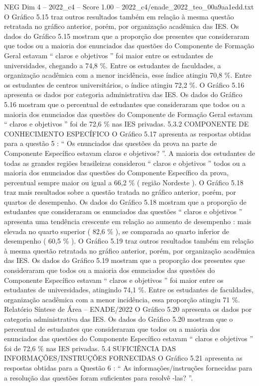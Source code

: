 \begin{textsample}{NEG Dim 4 – 2022\_c4 – Score 1.00 – 2022\_c4/enade\_2022\_teo\_00a9aa1edd.txt}
O Gráfico 5.15 traz outros resultados também em relação à mesma questão retratada no gráfico anterior, porém, por organização acadêmica das IES.
Os dados do Gráfico 5.15 mostram que a proporção dos presentes que consideraram que todos ou a maioria dos enunciados das questões do Componente de Formação Geral estavam “ claros e objetivos ” foi maior entre os estudantes de universidades, chegando a 74,8 \%.
Entre os estudantes de faculdades, a organização acadêmica com a menor incidência, esse índice atingiu 70,8 \%.
Entre os estudantes de centros universitários, o índice atingiu 72,2 \%.
O Gráfico 5.16 apresenta os dados por categoria administrativa das IES.
Os dados do Gráfico 5.16 mostram que o percentual de estudantes que consideraram que todos ou a maioria dos enunciados das questões do Componente de Formação Geral estavam “ claros e objetivos ” foi de 72,6 \% nas IES privadas. 5.3.2 COMPONENTE DE CONHECIMENTO ESPECÍFICO O Gráfico 5.17 apresenta as respostas obtidas para a questão 5 : “ Os enunciados das questões da prova na parte de Componente Específico estavam claros e objetivos? ”.
A maioria dos estudantes de todas as grandes regiões brasileiras considerou “ claros e objetivos ” todos ou a maioria dos enunciados das questões do Componente Específico da prova, percentual sempre maior ou igual a 66,2 \% ( região Nordeste ).
O Gráfico 5.18 traz mais resultados sobre a questão tratada no gráfico anterior, porém, por quartos de desempenho.
Os dados do Gráfico 5.18 mostram que a proporção de estudantes que consideraram os enunciados das questões “ claros e objetivos ” apresenta uma tendência crescente em relação ao aumento de desempenho : mais elevada no quarto superior ( 82,6 \% ), se comparada ao quarto inferior de desempenho ( 60,5 \% ).
O Gráfico 5.19 traz outros resultados também em relação à mesma questão retratada no gráfico anterior, porém, por organização acadêmica das IES.
Os dados do Gráfico 5.19 mostram que a proporção dos presentes que consideraram que todos ou a maioria dos enunciados das questões do Componente Específico estavam “ claros e objetivos ” foi maior entre os estudantes de universidades, atingindo 74,1 \%.
Entre os estudantes de faculdades, organização acadêmica com a menor incidência, essa proporção atingiu 71 \%.
Relatório Síntese de Área – ENADE/2022 O Gráfico 5.20 apresenta os dados por categoria administrativa das IES.
Os dados do Gráfico 5.20 mostram que o percentual de estudantes que consideraram que todos ou a maioria dos enunciados das questões do Componente Específico estavam “ claros e objetivos ” foi de 72,6 \% nas IES privadas. 5.4 SUFICIÊNCIA DAS INFORMAÇÕES/INSTRUÇÕES FORNECIDAS O Gráfico 5.21 apresenta as respostas obtidas para a Questão 6 : “ As informações/instruções fornecidas para a resolução das questões foram suficientes para resolvê -las? ”.

\end{textsample}
